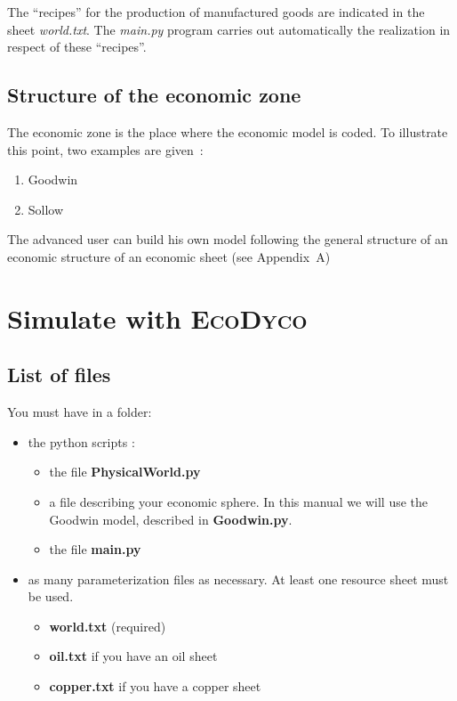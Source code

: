 \documentclass[12pt,a4paper]{article}%
\newcommand{\ed}{\textsc{EcoDyco}}
\begin{document}
The ``recipes'' for the production of manufactured goods are indicated in the sheet \textit{world.txt}. The \textit{main.py} program carries out automatically the realization in respect of these ``recipes''.

\subsection{Structure of the economic zone}

The economic zone is the place where the economic model is coded. To illustrate this point, two examples are given~:

\begin{enumerate}
\item Goodwin

\item Sollow
\end{enumerate}

The advanced user can build his own model following the general structure of an economic structure of an economic sheet (see Appendix~A)







\section{Simulate with \ed}

\subsection{List of files}

You must have in a folder:

\begin{itemize}
	\item the python scripts :
	
	\begin{itemize}
		\item the file \textbf{PhysicalWorld.py}
		
		\item a file describing your economic sphere. In this manual we will use the Goodwin model, described in \textbf{Goodwin.py}.
		
		\item the file \textbf{main.py}
	\end{itemize}
\end{itemize}

\begin{itemize}
	\item as many parameterization files as necessary. At least one resource sheet must be used.
	
	\begin{itemize}
		\item \textbf{world.txt} (required)
		
		\item \textbf{oil.txt} if you have an oil sheet
		
		\item \textbf{copper.txt} if you have a copper sheet
		
	\end{itemize}
\end{itemize}
\end{document}
